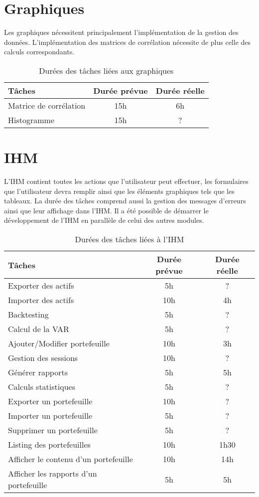 \documentclass[a4paper]{report}
\begin{document}
\section{Graphiques}
Les graphiques nécessitent principalement l'implémentation de la gestion des données.
L'implémentation des matrices de corrélation nécessite de plus celle des calculs correspondants.

\begin{table}[H]
\centering
  \begin{tabularx}{0.8\textwidth}{| X | c | c |}
    \hline
	Tâches & Durée prévue & Durée réelle \\
    \hline
    Matrice de corrélation &  15h & 6h\\
    Histogramme &  15h & ?\\
    \hline
  \end{tabularx}
  \caption{Durées des tâches liées aux graphiques}
\end{table}


\section{IHM}
L'IHM contient toutes les actions que l'utilisateur peut effectuer, les formulaires que l'utilisateur devra remplir ainsi que les éléments graphiques tels que les tableaux.
La durée des tâches comprend aussi la gestion des messages d'erreurs ainsi que leur affichage dans l'IHM.
Il a été possible de démarrer le développement de l'IHM en parallèle de celui des autres modules.

\begin{table}[H]
\centering
  \begin{tabularx}{0.8\textwidth}{| X | c | c |}
    \hline
	Tâches & Durée prévue & Durée réelle \\
    \hline
    Exporter des actifs & 5h & ?\\
    Importer des actifs & 10h & 4h\\
    Backtesting & 5h & ?\\
    Calcul de la VAR & 5h & ?\\
    Ajouter/Modifier portefeuille & 10h & 3h\\
    Gestion des sessions & 10h & ?\\
    Générer rapports & 5h & 5h\\
    Calculs statistiques & 5h & ?\\
    Exporter un portefeuille & 10h & ?\\
    Importer un portefeuille & 5h & ?\\
    Supprimer un portefeuille & 5h & ?\\
    Listing des portefeuilles & 10h & 1h30\\
    Afficher le contenu d'un portefeuille & 10h & 14h\\
    Afficher les rapports d'un portefeuille & 5h & 5h\\
    \hline
  \end{tabularx}
  \caption{Durées des tâches liées à l'IHM}
\end{table}
\end{document}
